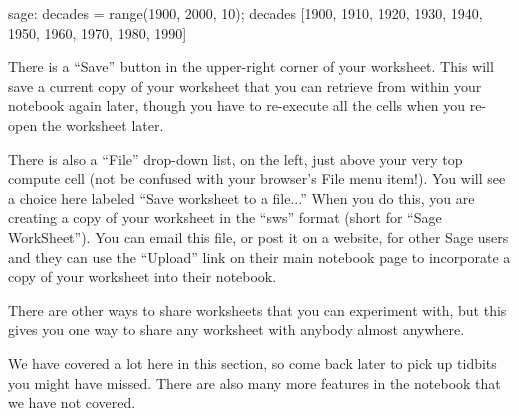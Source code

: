 %
\begin{sageexample}
sage: decades = range(1900, 2000, 10); decades
[1900, 1910, 1920, 1930, 1940, 1950, 1960, 1970, 1980, 1990]
\end{sageexample}
%
%
There is a ``Save'' button in the upper-right corner of your worksheet.  This will save a current copy of your worksheet that you can retrieve from within your notebook again later, though you have to re-execute all the cells when you re-open the worksheet later.\par
%
There is also a ``File'' drop-down list, on the left, just above your very top compute cell (not be confused with your browser's File menu item!).  You will see a choice here labeled  ``Save worksheet to a file...''  When you do this, you are creating a copy of your worksheet in the ``sws'' format (short for ``Sage WorkSheet'').  You can email this file, or post it on a website, for other Sage users and they can use the ``Upload'' link on their main notebook page to incorporate a copy of your worksheet into their notebook.\par
%
There are other ways to share worksheets that you can experiment with, but this gives you one way to share any worksheet with anybody almost anywhere.\par
%
We have covered a lot here in this section, so come back later to pick up tidbits you might have missed.  There are also many more features in the notebook that we have not covered.
%